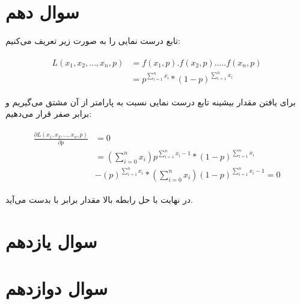 \documentclass[paper=a4, fontsize=11pt]{article}
\numberwithin{equation}{section} %
\numberwithin{figure}{section} %
\numberwithin{table}{section} %
\begin{document}
\section{سوال دهم}
تابع درست نمایی را به صورت زیر تعریف می‌کنیم:

\begin{align}
\begin{split}
    L(x_1, x_2, \ldots, x_n, p) &= f(x_1, p) . f(x_2, p) . \ldots . f(x_n, p)\\
    &= p^{\sum_{i=1}^{n} x_i} * (1-p)^{\sum_{i=1}^{n} x_i}
\end{split}
\end{align}

برای یافتن مقدار بیشینه تابع درست نمایی نسبت به پارامتر 
از آن مشتق می‌گیریم و برابر صفر قرار می‌دهیم:

\begin{align}
\begin{split}
    \frac{\partial L(x_1, x_2, \ldots, x_n, p)}{\partial p} &= 0\\
    &= (\sum_{i=0}^{n} x_i) p^{\sum_{i=1}^{n} x_i - 1} * (1-p)^{\sum_{i=1}^{n} x_i}\\
    &- (p)^{\sum_{i=1}^{n} x_i} * (\sum_{i=0}^{n} x_i) (1-p)^{\sum_{i=1}^{n} x_i - 1} = 0
\end{split}
\end{align}

در نهایت با حل رابطه بالا مقدار  برابر با 
بدست می‌آید.

\section{سوال یازدهم}

\section{سوال دوازدهم}
\end{document}
